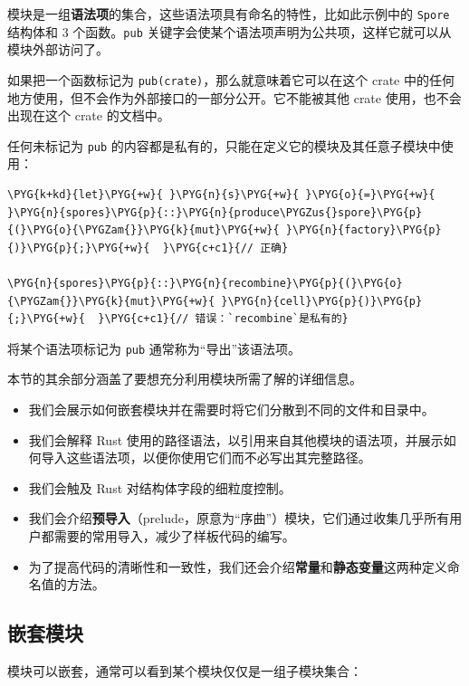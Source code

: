 模块是一组\textbf{语法项}的集合，这些语法项具有命名的特性，比如此示例中的 \texttt{Spore} 结构体和 3 个函数。\texttt{pub} 关键字会使某个语法项声明为公共项，这样它就可以从模块外部访问了。

如果把一个函数标记为 \texttt{pub(crate)}，那么就意味着它可以在这个 crate 中的任何地方使用，但不会作为外部接口的一部分公开。它不能被其他 crate 使用，也不会出现在这个 crate 的文档中。

任何未标记为 \texttt{pub} 的内容都是私有的，只能在定义它的模块及其任意子模块中使用：

\begin{Verbatim}[commandchars=\\\{\},breaklines=true,breakanywhere=true,fontsize=\codefont,xleftmargin=17bp]
\PYG{k+kd}{let}\PYG{+w}{ }\PYG{n}{s}\PYG{+w}{ }\PYG{o}{=}\PYG{+w}{ }\PYG{n}{spores}\PYG{p}{::}\PYG{n}{produce\PYGZus{}spore}\PYG{p}{(}\PYG{o}{\PYGZam{}}\PYG{k}{mut}\PYG{+w}{ }\PYG{n}{factory}\PYG{p}{)}\PYG{p}{;}\PYG{+w}{  }\PYG{c+c1}{// 正确}

\PYG{n}{spores}\PYG{p}{::}\PYG{n}{recombine}\PYG{p}{(}\PYG{o}{\PYGZam{}}\PYG{k}{mut}\PYG{+w}{ }\PYG{n}{cell}\PYG{p}{)}\PYG{p}{;}\PYG{+w}{  }\PYG{c+c1}{// 错误：`recombine`是私有的}
\end{Verbatim}

将某个语法项标记为 \texttt{pub} 通常称为“导出”该语法项。

本节的其余部分涵盖了要想充分利用模块所需了解的详细信息。

\begin{itemize}
\item 我们会展示如何嵌套模块并在需要时将它们分散到不同的文件和目录中。
\item 我们会解释 Rust 使用的路径语法，以引用来自其他模块的语法项，并展示如何导入这些语法项，以便你使用它们而不必写出其完整路径。
\item 我们会触及 Rust 对结构体字段的细粒度控制。
\item 我们会介绍\textbf{预导入}（prelude，原意为“序曲”）模块，它们通过收集几乎所有用户都需要的常用导入，减少了样板代码的编写。
\item 为了提高代码的清晰性和一致性，我们还会介绍\textbf{常量}和\textbf{静态变量}这两种定义命名值的方法。
\end{itemize}

\subsection{嵌套模块}

模块可以嵌套，通常可以看到某个模块仅仅是一组子模块集合：

